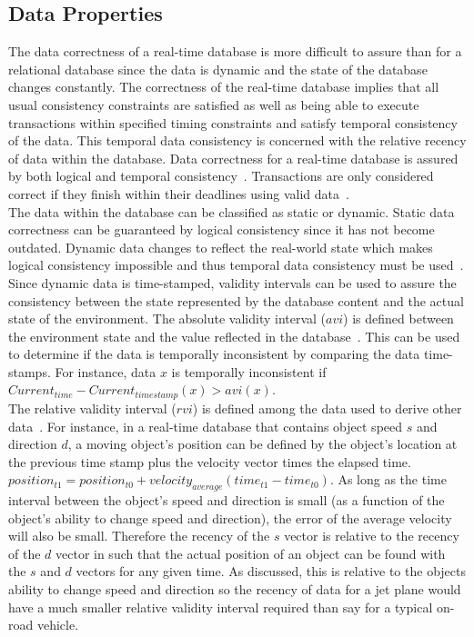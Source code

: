 \documentclass[conference]{IEEEtran}
\begin{document}
\subsection{Data Properties}
The data correctness of a real-time database is more difficult to assure than for a relational database since the data is dynamic and the state of the database changes constantly.  The correctness of the real-time database implies that all usual consistency constraints are satisfied as well as being able to execute transactions within specified timing constraints and satisfy temporal consistency of the data. This temporal data consistency is concerned with the relative recency of data within the database. Data correctness for a real-time database is assured by both logical and temporal consistency~\cite{Kang}. Transactions are only considered correct if they finish within their deadlines using valid data~\cite{Buchmann}.\\
\indent The data within the database can be classified as static or dynamic. Static data correctness can be guaranteed by logical consistency since it has not become outdated. Dynamic data changes to reflect the real-world state which makes logical consistency impossible and thus temporal data consistency must be used~\cite{Kang}.\\
\indent Since dynamic data is time-stamped, validity intervals can be used to assure the consistency between the state represented by the database content and the actual state of the environment. The absolute validity interval ($avi$) is defined between the environment state and the value reflected in the database~\cite{Halpin}. This can be used to determine if the data is temporally inconsistent by comparing the data time-stamps. For instance, data $x$ is temporally inconsistent if $Current_{time} - Current_{timestamp}(x)>avi(x)$.\\
\indent The relative validity interval ($rvi$) is defined among the data used to derive other data~\cite{Erickson}.  For instance, in a real-time database that contains object speed $s$ and direction $d$, a moving object's position can be defined by the object's location at the previous time stamp plus the velocity vector times the elapsed time. $position_{t1} = position_{t0} + velocity_{average} (time_{t1} - time_{t0})$. As long as the time interval between the object's speed and direction is small (as a function of the object's ability to change speed and direction), the error of the average velocity will also be small. Therefore the recency of the $s$ vector is relative to the recency of the $d$ vector in such that the actual position of an object can be found with the $s$ and $d$ vectors for any given time. As discussed, this is relative to the objects ability to change speed and direction so the recency of data for a jet plane would have a much smaller relative validity interval required than say for a typical on-road vehicle.\\
\end{document}
